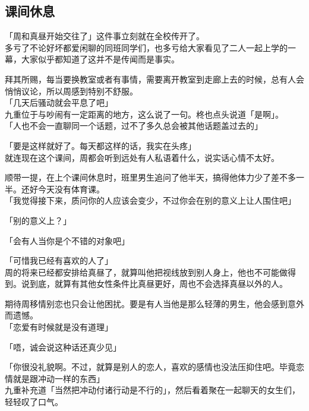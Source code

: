 ﻿\subsection{课间休息}

「周和真昼开始交往了」这件事立刻就在全校传开了。\\

多亏了不论好坏都爱闲聊的同班同学们，也多亏给大家看见了二人一起上学的一幕，大家似乎都知道了这并不是传闻而是事实。

拜其所赐，每当要换教室或者有事情，需要离开教室到走廊上去的时候，总有人会悄悄议论，所以周感到特别不舒服。\\

「几天后骚动就会平息了吧」\\

九重位于与吵闹有一定距离的地方，这么说了一句。柊也点头说道「是啊」。\\

「人也不会一直聊同一个话题，过不了多久总会被其他话题盖过去的」

「要是这样就好了。每天都这样的话，我实在头疼」\\

就连现在这个课间，周都会听到远处有人私语着什么，说实话心情不太好。

顺带一提，在上个课间休息时，班里男生追问了他半天，搞得他体力少了差不多一半。还好今天没有体育课。\\

「我觉得接下来，质问你的人应该会变少，不过你会在别的意义上让人围住吧」

「别的意义上？」

「会有人当你是个不错的对象吧」

「可惜我已经有喜欢的人了」\\

周的将来已经都安排给真昼了，就算叫他把视线放到别人身上，他也不可能做得到。说到底，就算有其他女性条件比真昼更好，周也不会选择真昼以外的人。

期待周移情别恋也只会让他困扰。要是有人当他是那么轻薄的男生，他会感到意外而遗憾。\\

「恋爱有时候就是没有道理」

「唔，诚会说这种话还真少见」

「你很没礼貌啊。不过，就算是别人的恋人，喜欢的感情也没法压抑住吧。毕竟恋情就是跟冲动一样的东西」\\

九重补充道「当然把冲动付诸行动是不行的」，然后看着聚在一起聊天的女生们，轻轻叹了口气。\\

